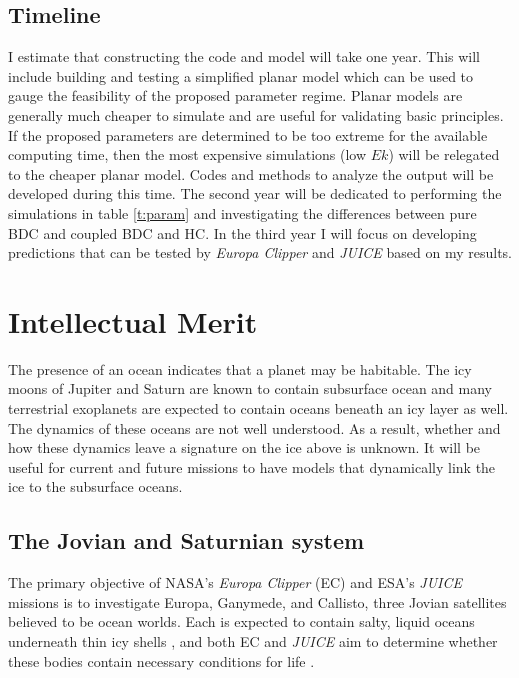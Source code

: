 \documentclass[12pt]{article}
\begin{document}
 \subsection{Timeline}
 I estimate that constructing the code and model will take one year. This will include building and testing a simplified planar model which can be used to gauge the feasibility of the proposed parameter regime. Planar models are generally much cheaper to simulate and are useful for validating basic principles. If the proposed parameters are determined to be too extreme for the available computing time, then the most expensive simulations (low $Ek$) will be relegated to the cheaper planar model. Codes and methods to analyze the output will be developed during this time. The second year will be dedicated to performing the simulations in table \ref{t:param} and investigating the differences between pure BDC and coupled BDC and HC. In the third year I will focus on developing predictions that can be tested by \textit{Europa Clipper} and \textit{JUICE} based on my results.%

\section{Intellectual Merit}
The presence of an ocean indicates that a planet may be habitable\citep{tB24}. The icy moons of Jupiter and Saturn are known to contain subsurface ocean and many terrestrial exoplanets are expected to contain oceans beneath an icy layer as well\citep{lQ20}. The dynamics of these oceans are not well understood. As a result, whether and how these dynamics leave a signature on the ice above is unknown. It will be useful for current and future missions to have models that dynamically link the ice to the subsurface oceans.

\subsection{The Jovian and Saturnian system}
The primary objective of NASA's \textit{Europa Clipper} (EC)\cite{pC14_EC} and ESA's \textit{JUICE} \citep{oG13} missions is to investigate Europa, Ganymede, and Callisto, three Jovian satellites believed to be ocean worlds. Each is expected to contain salty, liquid oceans underneath thin icy shells \citep{rP99,fN16}, and both EC and \textit{JUICE} aim to determine whether these bodies contain necessary conditions for life \citep{tB24}. 
\end{document}
